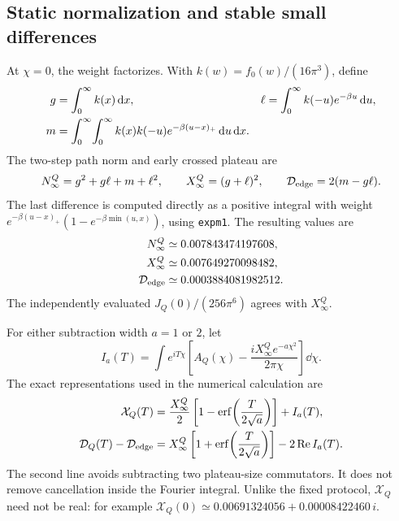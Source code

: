 \subsection{Static normalization and stable small differences}
At $\chi=0$, the weight factorizes. With $k(w)=f_0(w)/(16\pi^3)$, define
\begin{align}
 g&=\int_0^\infty k(x)\mathop{}\!\mathrm d x,&
 \ell&=\int_0^\infty k(-u)e^{-\beta u}\mathop{}\!\mathrm d u,\notag\\
 m&=\int_0^\infty\!\int_0^\infty
       k(x)k(-u)e^{-\beta(u-x)_+}\mathop{}\!\mathrm d u\mathop{}\!\mathrm d x.
\end{align}
The two-step path norm and early crossed plateau are
\begin{equation}
 N_\infty^Q=g^2+g\ell+m+\ell^2,\qquad
 X_\infty^Q=(g+\ell)^2,\qquad
 \mathcal D_{\rm edge}=2(m-g\ell).
 \label{eq:mq-static}
\end{equation}
The last difference is computed directly as a positive integral with
weight $e^{-\beta(u-x)_+}(1-e^{-\beta\min(u,x)})$, using
\texttt{expm1}. The resulting values are
\begin{align}
 N_\infty^Q&\simeq0.007843474197608,\notag\\
 X_\infty^Q&\simeq0.007649270098482,\notag\\
 \mathcal D_{\rm edge}&\simeq0.0003884081982512.
 \label{eq:mq-static-values}
\end{align}
The independently evaluated $J_Q(0)/(256\pi^6)$ agrees with
$X_\infty^Q$.

For either subtraction width $a=1$ or $2$, let
\begin{equation}
 I_a(T)=\int e^{iT\chi}
 \left[A_Q(\chi)-\frac{iX_\infty^Q e^{-a\chi^2}}{2\pi\chi}\right]\dd\chi.
\end{equation}
The exact representations used in the numerical calculation are
\begin{align}
 \mathcal X_Q(T)&=\frac{X_\infty^Q}{2}
       \left[1-\operatorname{erf}\!\left(\frac{T}{2\sqrt a}\right)\right]
       +I_a(T),\notag\\
 \mathcal D_Q(T)-\mathcal D_{\rm edge}
   &=X_\infty^Q\left[1+\operatorname{erf}\!\left(\frac{T}{2\sqrt a}\right)\right]
       -2\operatorname{Re}I_a(T).
 \label{eq:mq-small-difference}
\end{align}
The second line avoids subtracting two plateau-size commutators. It
does not remove cancellation inside the Fourier integral. Unlike the
fixed protocol, $\mathcal X_Q$ need not be real: for example
$\mathcal X_Q(0)\simeq0.00691324056+0.00008422460\,i$.


